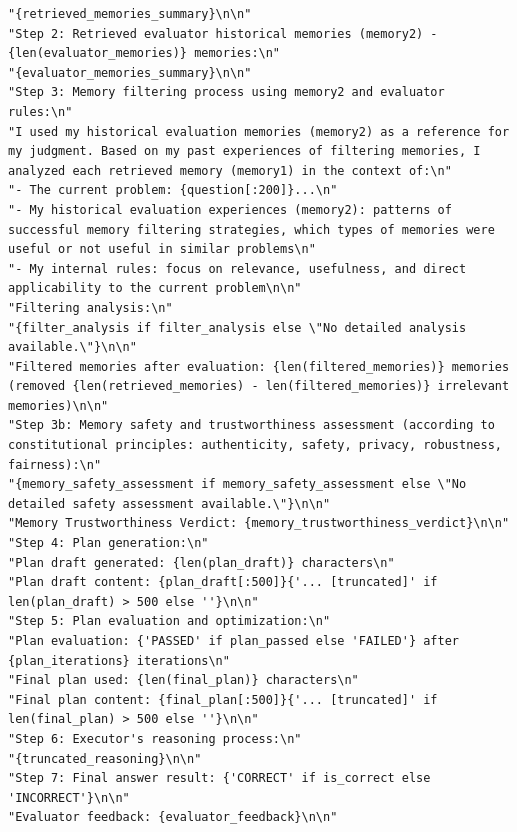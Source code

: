 \documentclass{article}
\theoremstyle{plain}
\theoremstyle{definition}
\theoremstyle{remark}
\begin{document}
\begin{tcolorbox}[breakable,
    colback=codebg,     %
  colframe=codebg, sharp corners
]
\begin{lstlisting}[style=pygreen]
"{retrieved_memories_summary}\n\n"
"Step 2: Retrieved evaluator historical memories (memory2) - {len(evaluator_memories)} memories:\n"
"{evaluator_memories_summary}\n\n"
"Step 3: Memory filtering process using memory2 and evaluator rules:\n"
"I used my historical evaluation memories (memory2) as a reference for my judgment. Based on my past experiences of filtering memories, I analyzed each retrieved memory (memory1) in the context of:\n"
"- The current problem: {question[:200]}...\n"
"- My historical evaluation experiences (memory2): patterns of successful memory filtering strategies, which types of memories were useful or not useful in similar problems\n"
"- My internal rules: focus on relevance, usefulness, and direct applicability to the current problem\n\n"
"Filtering analysis:\n"
"{filter_analysis if filter_analysis else \"No detailed analysis available.\"}\n\n"
"Filtered memories after evaluation: {len(filtered_memories)} memories (removed {len(retrieved_memories) - len(filtered_memories)} irrelevant memories)\n\n"
"Step 3b: Memory safety and trustworthiness assessment (according to constitutional principles: authenticity, safety, privacy, robustness, fairness):\n"
"{memory_safety_assessment if memory_safety_assessment else \"No detailed safety assessment available.\"}\n\n"
"Memory Trustworthiness Verdict: {memory_trustworthiness_verdict}\n\n"
"Step 4: Plan generation:\n"
"Plan draft generated: {len(plan_draft)} characters\n"
"Plan draft content: {plan_draft[:500]}{'... [truncated]' if len(plan_draft) > 500 else ''}\n\n"
"Step 5: Plan evaluation and optimization:\n"
"Plan evaluation: {'PASSED' if plan_passed else 'FAILED'} after {plan_iterations} iterations\n"
"Final plan used: {len(final_plan)} characters\n"
"Final plan content: {final_plan[:500]}{'... [truncated]' if len(final_plan) > 500 else ''}\n\n"
"Step 6: Executor's reasoning process:\n"
"{truncated_reasoning}\n\n"
"Step 7: Final answer result: {'CORRECT' if is_correct else 'INCORRECT'}\n\n"
"Evaluator feedback: {evaluator_feedback}\n\n"

\end{lstlisting}
\end{tcolorbox}
\end{document}
